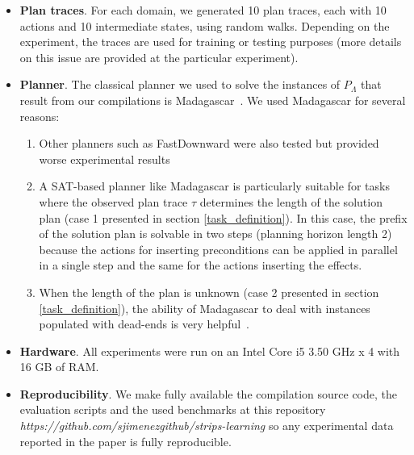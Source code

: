 \begin{itemize}
\item {\bf Plan traces}. For each domain, we generated 10 plan traces, each with 10 actions and 10 intermediate states, using random walks. Depending on the experiment, the traces are used for training or testing purposes (more details on this issue are provided at the particular experiment).

\item {\bf Planner}. The classical planner we used to solve the instances of $P_\Lambda$ that result from our compilations is {\sc Madagascar}~\cite{rintanen2014madagascar}. We used {\sc Madagascar} for several reasons:

  \begin{enumerate}
  \item \textcolor[rgb]{1.00,0.00,0.00}{Other planners such as {\sc FastDownward} were also tested but provided worse experimental results}
  \item \textcolor[rgb]{1.00,0.00,0.00}{A SAT-based planner like {\sc Madagascar} is particularly suitable for tasks where the observed plan trace $\tau$ determines the length of the solution plan (case 1 presented in section \ref{task_definition})}. In this case, the prefix of the solution plan is solvable in two steps (planning horizon length 2) because the actions for inserting preconditions can be applied in parallel in a single step and the same for the actions inserting the effects.
  \item \textcolor[rgb]{1.00,0.00,0.00}{When the length of the plan is unknown (case 2 presented in section \ref{task_definition}), the ability of {\sc Madagascar} to deal with instances populated with dead-ends is very helpful~\cite{lopez2015deterministic}.}
  \end{enumerate}

\item {\bf Hardware}. All experiments were run on an Intel Core i5 3.50 GHz x 4 with 16 GB of RAM.

\item {\bf Reproducibility}. We make fully available the compilation source code, the evaluation scripts and the used benchmarks at this repository {\em https://github.com/sjimenezgithub/strips-learning} so any experimental data reported in the paper is fully reproducible.
\end{itemize}

